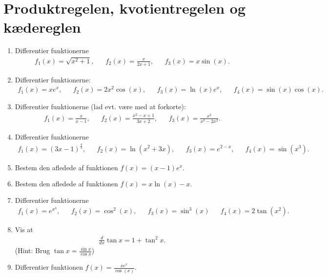 \section{Produktregelen, kvotientregelen og kædereglen}
\begin{enumerate}

	\item Differentier funktionerne
	\begin{align*}
	f_1(x)=\sqrt{x^2+1},&& f_2(x)=\frac{x}{2x+1},&& f_3(x)=x\sin(x).
	\end{align*}

	\item Differentier funktionerne:
	\begin{align*}
	f_1(x)=xe^x,&& f_2(x)=2x^2\cos(x),&& f_3(x)=\ln(x)e^x,&& f_4(x)=\sin(x)\cos(x).
	\end{align*}

	\item Differentier funktionerne (lad evt. være med at forkorte):
	\begin{align*}
	f_1(x)=\frac{x}{x-1},&&f_2(x)=\frac{x^2-x+1}{3x+2},&&f_3(x)=\frac{x^2}{x^3-2x^2}.
	\end{align*}
	
	\item Differentier funktionerne
	\begin{align*}
	f_1(x)=(3x-1)^\frac{4}{3},&& f_2(x)=\ln(x^2+3x),&& f_3(x)=e^{2-x},&&f_4(x)=\sin(x^3).
	\end{align*}
	
	\item \label{it:diff24} Bestem den afledede af funktionen $f(x)=(x-1)e^x$.
	
	
	\item \label{it:diff23}Bestem den afledede af funktionen $f(x)=x\ln(x)-x$.
	
	\item Differentier funktionerne 
	\begin{align*}
	f_1(x)=e^{x^3},&&f_2(x)=\cos^2(x),&&f_3(x)=\sin^3(x)&&f_4(x)=2\tan(x^2).
	\end{align*}
		
	\item\label{it:diff21} Vis at 
	\begin{align*}
	\frac{d}{dx} \tan x= 1+\tan^2x.
	\end{align*}
	(Hint: Brug $\tan x=\frac{\sin x}{\cos x}$)

	\item Differentier funktionen $f(x)=\frac{xe^x}{\cos(x)}$.
		

\end{enumerate}
